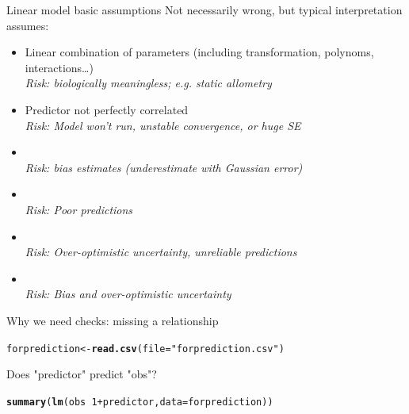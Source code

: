 \documentclass[10pt]{beamer}\usepackage[]{graphicx}\usepackage[]{color}
\makeatletter
\newcommand{\hlnum}[1]{\textcolor[rgb]{0.686,0.059,0.569}{#1}}%
\newcommand{\hlstr}[1]{\textcolor[rgb]{0.192,0.494,0.8}{#1}}%
\newcommand{\hlopt}[1]{\textcolor[rgb]{0,0,0}{#1}}%
\newcommand{\hlstd}[1]{\textcolor[rgb]{0.345,0.345,0.345}{#1}}%
\newcommand{\hlkwb}[1]{\textcolor[rgb]{0.69,0.353,0.396}{#1}}%
\newcommand{\hlkwc}[1]{\textcolor[rgb]{0.333,0.667,0.333}{#1}}%
\newcommand{\hlkwd}[1]{\textcolor[rgb]{0.737,0.353,0.396}{\textbf{#1}}}%
\newenvironment{kframe}{%
 \def\at@end@of@kframe{}%
 \ifinner\ifhmode%
  \def\at@end@of@kframe{\end{minipage}}%
  \begin{minipage}{\columnwidth}%
 \fi\fi%
 \def\FrameCommand##1{\hskip\@totalleftmargin \hskip-\fboxsep
 \colorbox{shadecolor}{##1}\hskip-\fboxsep
     \hskip-\linewidth \hskip-\@totalleftmargin \hskip\columnwidth}%
 \MakeFramed {\advance\hsize-\width
   \@totalleftmargin\z@ \linewidth\hsize
   \@setminipage}}%
 {\par\unskip\endMakeFramed%
 \at@end@of@kframe}
\newenvironment{knitrout}{}{} %
\makeatother
\begin{document}
\begin{frame}{Linear model basic assumptions}
Not necessarily wrong, but typical interpretation assumes:
 \begin{block}{}
     \begin{itemize}[<+->]
      \item Linear combination of parameters (including transformation, polynoms, interactions\dots)\\ \textit{Risk: biologically meaningless; e.g. static allometry}
      \item Predictor not perfectly correlated \\ \textit{Risk: Model won't run, unstable convergence, or huge SE}
       \item {\color{red!20!black}{Measurement error in predictors}}\\ \textit{Risk: bias estimates (underestimate with Gaussian error)}
       \item {\color{red!50!black}{Gaussian error distribution}}\\ \textit{Risk: Poor predictions}
       \item {\color{red!70!black}{Homoscedasticity (constant error variance)}}\\ \textit{Risk: Over-optimistic uncertainty, unreliable predictions}
       \item {\color{red!99!black}{Independence of error}}\\ \textit{Risk: Bias and over-optimistic uncertainty}
     \end{itemize}
 \end{block}
\end{frame}

\begin{frame}[fragile]{Why we need checks: missing a relationship}
  


\begin{knitrout}\small
{}\color{fgcolor}\begin{kframe}
\begin{alltt}
 \hlstd{forprediction} \hlkwb{<-} \hlkwd{read.csv}\hlstd{(}\hlkwc{file} \hlstd{=} \hlstr{"forprediction.csv"}\hlstd{)}
\end{alltt}
\end{kframe}
\end{knitrout}
  Does "predictor" predict "obs"? 
 \pause

\begin{knitrout}\small
{}\color{fgcolor}\begin{kframe}
\begin{alltt}
  \hlkwd{summary}\hlstd{(}\hlkwd{lm}\hlstd{(obs} \hlopt{~} \hlnum{1} \hlopt{+} \hlstd{predictor,} \hlkwc{data}\hlstd{=forprediction) )}
\end{alltt}
\end{kframe}
\end{knitrout}
\end{frame}
\end{document}
